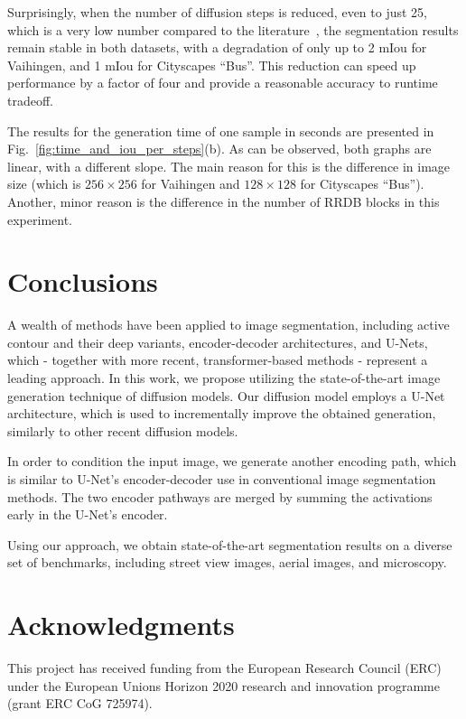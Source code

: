 \documentclass[10pt,twocolumn,letterpaper]{article}
\begin{document}
Surprisingly, when the number of diffusion steps is reduced, even to just 25, which is a very low number compared to the literature~\cite{ho2020denoising,nichol2021improved}, the segmentation results remain stable in both datasets, with a degradation of only up to 2 mIou for Vaihingen, and 1 mIou for Cityscapes ``Bus''. This reduction can speed up performance by a factor of four and provide a reasonable accuracy to runtime tradeoff.

The results for the generation time of one sample in seconds are presented in Fig.~\ref{fig:time_and_iou_per_steps}(b). As can be observed, both graphs are linear, with a different slope. The main reason for this is the difference in image size (which is $256 \times 256$ for Vaihingen and $128 \times 128$ for Cityscapes ``Bus''). Another, minor reason is the difference in the number of RRDB blocks in this experiment.

\section{Conclusions}

A wealth of methods have been applied to image segmentation, including active contour and their deep variants, encoder-decoder architectures, and U-Nets, which - together with more recent, transformer-based methods - represent a leading approach. In this work, we propose utilizing the state-of-the-art image generation technique of diffusion models. Our diffusion model employs a U-Net architecture, which is used to incrementally improve the obtained generation, similarly to other recent diffusion models. 

In order to condition the input image, we generate another encoding path, which is similar to U-Net's encoder-decoder use in conventional image segmentation methods. The two encoder pathways are merged by summing the activations early in the U-Net's encoder. 

Using our approach, we obtain state-of-the-art segmentation results on a diverse set of benchmarks, including street view images, aerial images, and microscopy.

\section{Acknowledgments}
This project has received funding from the European Research Council (ERC) under the European Unions Horizon 2020 research and innovation programme (grant ERC CoG 725974). 

{\small


}
\end{document}
